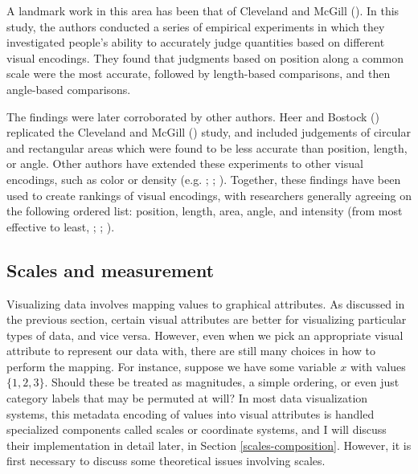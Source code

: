 \documentclass[
]{book}
\begin{document}
A landmark work in this area has been that of Cleveland and McGill (). In this study, the authors conducted a series of empirical experiments in which they investigated people's ability to accurately judge quantities based on different visual encodings. They found that judgments based on position along a common scale were the most accurate, followed by length-based comparisons, and then angle-based comparisons.

The findings were later corroborated by other authors. Heer and Bostock () replicated the Cleveland and McGill () study, and included judgements of circular and rectangular areas which were found to be less accurate than position, length, or angle. Other authors have extended these experiments to other visual encodings, such as color or density (e.g. ; ; ). Together, these findings have been used to create rankings of visual encodings, with researchers generally agreeing on the following ordered list: position, length, area, angle, and intensity (from most effective to least, ; ; ).

\subsection{Scales and measurement}\label{scales-measurement}

Visualizing data involves mapping values to graphical attributes. As discussed in the previous section, certain visual attributes are better for visualizing particular types of data, and vice versa. However, even when we pick an appropriate visual attribute to represent our data with, there are still many choices in how to perform the mapping. For instance, suppose we have some variable \(x\) with values \(\{ 1, 2, 3 \}\). Should these be treated as magnitudes, a simple ordering, or even just category labels that may be permuted at will? In most data visualization systems, this metadata encoding of values into visual attributes is handled specialized components called scales or coordinate systems, and I will discuss their implementation in detail later, in Section \ref{scales-composition}. However, it is first necessary to discuss some theoretical issues involving scales.
\end{document}
